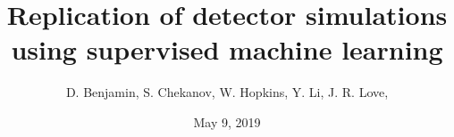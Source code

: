 \documentclass[showpacs,showkeys,preprint,prd,nofootinbib,linenumbers,12pt]{revtex4-1}
\begin{document}


\date{May 9, 2019}

\vspace{2.5cm}

\title{
  Replication of detector simulations using supervised machine learning 
}


\author{D. Benjamin, S. Chekanov, W. Hopkins, Y. Li, J. R. Love,}
% 



\begin{abstract}

\end{abstract}


\maketitle
\end{document}
